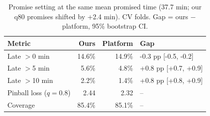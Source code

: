 \begin{table}[t]
\centering
\caption{Promise setting at the same mean promised time (37.7 min; our q80 promises shifted by +2.4 min). CV folds. Gap = ours $-$ platform, 95\% bootstrap CI.}
\label{tab:promise_cv}
\begin{tabular}{lrrl}
\toprule
Metric & Ours & Platform & Gap \\
\midrule
Late $>$0 min & 14.6\% & 14.9\% & -0.3 pp [-0.5, -0.2] \\
Late $>$5 min & 5.6\% & 4.8\% & +0.8 pp [+0.7, +0.9] \\
Late $>$10 min & 2.2\% & 1.4\% & +0.8 pp [+0.8, +0.9] \\
Pinball loss ($q=0.8$) & 2.44 & 2.32 & -- \\
Coverage & 85.4\% & 85.1\% & -- \\
\bottomrule
\end{tabular}
\end{table}
